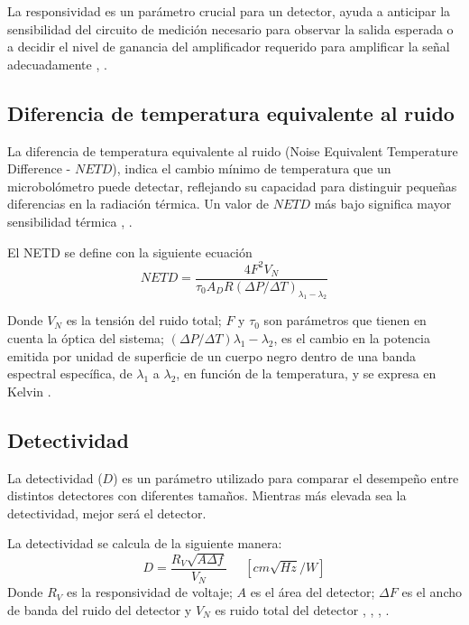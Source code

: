         La responsividad es un parámetro crucial para un detector, ayuda a anticipar la sensibilidad del circuito de medición necesario para observar la salida esperada o a decidir el nivel de ganancia del amplificador requerido para amplificar la señal adecuadamente \cite{Vincent}, \cite{Budzier}.
        
        \subsection{Diferencia de temperatura equivalente al ruido}
        La diferencia de temperatura equivalente al ruido (Noise Equivalent Temperature Difference - $NETD$), indica el cambio mínimo de temperatura que un microbolómetro puede detectar, reflejando su capacidad para distinguir pequeñas diferencias en la radiación térmica. Un valor de $NETD$ más bajo significa mayor sensibilidad térmica \cite{Jimenez}, \cite{Budzier}.


El NETD se define con la siguiente ecuación
        \begin{equation}
        NETD = \frac{4F^{2}V_{N}}{\tau_{0}A_{D}R(\Delta P/\Delta T)_{\lambda_{1}-\lambda_{2}}}
        \label{eq:NETD}
        \end{equation}
        
Donde $V_{N}$ es la tensión del ruido total; $F$ y $\tau_{0}$ son parámetros que tienen en cuenta la óptica del sistema; $(\Delta P/\Delta T)\lambda_{1}-\lambda_{2}$, es el cambio en la potencia emitida por unidad de superficie de un cuerpo negro dentro de una banda espectral específica, de $\lambda_{1}$ a $\lambda_{2}$, en función de la temperatura, y se expresa en Kelvin \cite{Fusetto2023}.
        
        \subsection{Detectividad}
        La detectividad ($D$) es un parámetro utilizado para comparar el desempeño entre distintos detectores con diferentes tamaños. Mientras más elevada sea la detectividad, mejor será el detector.
        
        La detectividad se calcula de la siguiente manera:
        \begin{equation}
        D = \frac{R_{V} \sqrt{A\Delta f}}{V_{N}}\phantom{abc} [cm\sqrt{Hz}/W]
        \label{eq:Detectivity}
        \end{equation}
        Donde $R_{V}$ es la responsividad de voltaje; $A$ es el área del detector; $\Delta F$ es el ancho de banda del ruido del detector y $V_{N}$ es ruido total del detector \cite{Vincent}, \cite{Jimenez}, \cite{Budzier}, \cite{Bhan2009}.
                
